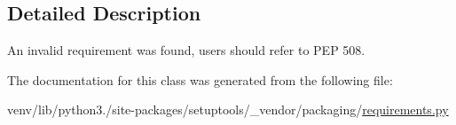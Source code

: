 \subsection{Detailed Description}
\begin{DoxyVerb}An invalid requirement was found, users should refer to PEP 508.
\end{DoxyVerb}
 

The documentation for this class was generated from the following file\+:\begin{DoxyCompactItemize}
\item 
venv/lib/python3./site-\/packages/setuptools/\+\_\+vendor/packaging/\hyperlink{setuptools_2__vendor_2packaging_2requirements_8py}{requirements.\+py}\end{DoxyCompactItemize}
